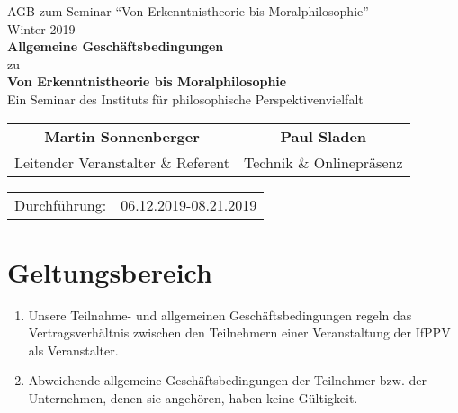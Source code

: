 \documentclass[a4paper, 12pt]{scrartcl}
\begin{document}
    \begin{titlepage}
        \begin{center}
            
	    \large {AGB zum Seminar \enquote{Von Erkenntnistheorie bis Moralphilosophie}} \\
            Winter 2019 \\
            \vspace{3cm}
            \textbf{ \Huge Allgemeine Gesch\"aftsbedingungen} \\
            \vspace{0.5cm}
            \large zu \\
            \vspace{1.5cm}
            \textbf{ \Large Von Erkenntnistheorie bis Moralphilosophie} \\
            \large Ein Seminar des Instituts f\"ur philosophische Perspektivenvielfalt

            \vspace{3cm}

            \begin{tabularx}{\textwidth}{CC}
            \textbf{Martin Sonnenberger} & \textbf{Paul Sladen} \\
            Leitender Veranstalter \& Referent & Technik \& Onlinepr\"asenz\\
            \end{tabularx}
           
            \vfill
            
            \begin{tabularx}{\textwidth}{XX}
                Durchführung: & 06.12.2019-08.21.2019
            \end{tabularx}
         \end{center}
    \end{titlepage}

    \section{Geltungsbereich}
    \begin{enumerate}
	\item Unsere Teilnahme- und allgemeinen Geschäftsbedingungen regeln das Vertragsverhältnis zwischen den Teilnehmern einer Veranstaltung der IfPPV als Veranstalter. 
	\item Abweichende allgemeine Geschäftsbedingungen der Teilnehmer bzw. der Unternehmen, denen sie angehören, haben keine Gültigkeit.
    \end{enumerate}
\end{document}
